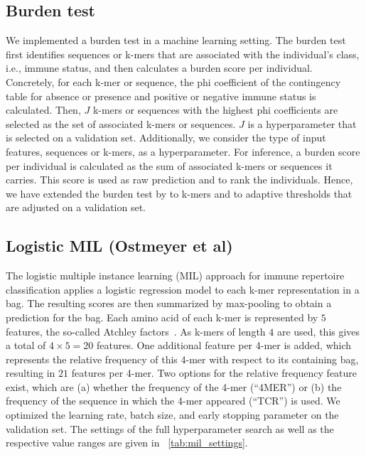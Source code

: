 \documentclass[oneside]{book}
\begin{document}
\subsection{Burden test} 
We implemented a burden test \citep{emerson2017immunosequencing,li2008methods,wu2011rare} in a machine learning
setting. The burden test first identifies sequences or k-mers that are associated
with the individual's class, i.e., immune status, and then calculates a burden 
score per individual. Concretely, for each k-mer or sequence, the phi coefficient
of the contingency table for absence or presence and positive or negative immune status
is calculated. Then, $J$ k-mers or sequences with the highest phi coefficients 
are selected as the set of associated k-mers or sequences. $J$ is a hyperparameter that 
is selected on a validation set. Additionally, we consider the type of input 
features, sequences or k-mers, as a hyperparameter. For inference, a burden score
per individual is calculated as the sum of associated k-mers or sequences it carries. 
This score is used as raw prediction and to rank the individuals.
Hence, we have extended the burden test by \citet{emerson2017immunosequencing} 
to k-mers and to adaptive thresholds that are adjusted on a validation set. 

\subsection{Logistic MIL (Ostmeyer et al)}
The logistic multiple instance learning (MIL) approach for immune 
repertoire classification \citep{ostmeyer2019biophysicochemical} applies a logistic 
regression model to each k-mer representation in a bag.
The resulting scores are then 
summarized by max-pooling to obtain a prediction for the bag.
%
Each amino acid of each k-mer is represented by $5$ features, the so-called 
Atchley factors~\citep{atchley2005solving}. As k-mers of length $4$ are used, 
this gives a total of $4\times5=20$ features.
%
One additional feature per 4-mer is added, which represents the relative 
frequency of this 4-mer with respect to its containing bag, resulting in 
$21$ features per 4-mer.
Two options for the relative frequency feature exist, which are
(a) whether the frequency of the 4-mer (``4MER'') or
(b) the frequency of the sequence in which the 4-mer appeared (``TCR\textbeta'') is used.
%
We optimized the learning rate, batch size, and early stopping parameter 
on the validation set. The settings of the full hyperparameter search as
well as the respective value ranges are given in
\tablename~\ref{tab:mil_settings}.
%
\end{document}

